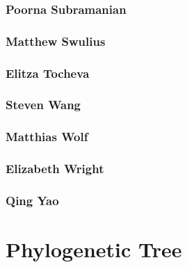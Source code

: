 \documentclass[]{tufte-book}
\begin{document}
\hypertarget{poorna_subramanian}{\subsection{Poorna
Subramanian}\label{poorna_subramanian}}

\hypertarget{matthew_swulius}{\subsection{Matthew
Swulius}\label{matthew_swulius}}

\hypertarget{elitza_tocheva}{\subsection{Elitza
Tocheva}\label{elitza_tocheva}}

\hypertarget{steven_wang}{\subsection{Steven Wang}\label{steven_wang}}

\subsection{Matthias Wolf}\label{matthias_wolf}

\hypertarget{elizabeth_wright}{\subsection{Elizabeth
Wright}\label{elizabeth_wright}}

\hypertarget{qing_yao}{\subsection{Qing Yao}\label{qing_yao}}

\chapter{Phylogenetic Tree}\label{phylogenetic-tree}
\end{document}
